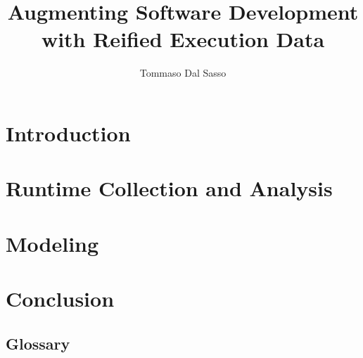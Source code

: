 \documentclass[]{tommaso-thesis}
\title{Augmenting Software Development \\with Reified Execution Data}
\author{Tommaso Dal Sasso}
\begin{document}
\maketitle %

\frontmatter %








\tableofcontents
\listoffigures %
\listoftables %

\mainmatter

\part{Introduction}
  
  

\part{Runtime Collection and Analysis}
  
  
%  
  

\part{Modeling}
  
  

\part{Conclusion}
  






\backmatter

\chapter{Glossary} %

%

%


\cleardoublepage
\theindex %
\end{document}
